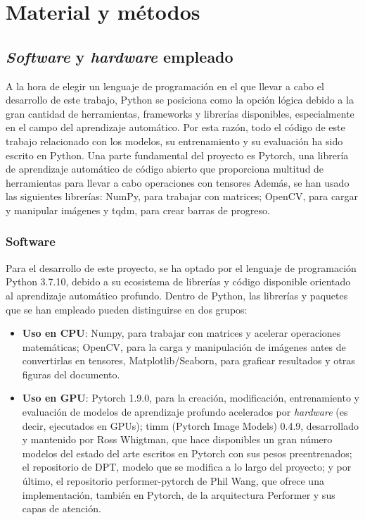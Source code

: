 \section{Material y métodos}

\subsection{\textit{Software} y \textit{hardware} empleado}

A la hora de elegir un lenguaje de programación en el que llevar a cabo el desarrollo de este trabajo, Python se posiciona como la opción lógica debido a la gran cantidad de herramientas, frameworks y librerías disponibles, especialmente en el campo del aprendizaje automático. Por esta razón, todo el código de este trabajo relacionado con los modelos, su entrenamiento y su evaluación ha sido escrito en Python.  Una parte fundamental del proyecto es Pytorch, una librería de aprendizaje automático de código abierto que proporciona multitud de herramientas para llevar a cabo operaciones con tensores 
Además, se han usado las siguientes librerías: NumPy, para trabajar con matrices; OpenCV, para cargar y manipular imágenes y tqdm, para crear barras de progreso.

\subsubsection{Software}


Para el desarrollo de este proyecto, se ha optado por el lenguaje de programación Python 3.7.10, debido a su ecosistema de librerías y código disponible orientado al aprendizaje automático profundo. Dentro de Python, las librerías y paquetes que se han empleado pueden distinguirse en dos grupos: 
\begin{itemize}
\item \textbf{Uso en CPU}: Numpy, para trabajar con matrices y acelerar operaciones matemáticas; OpenCV, para la carga y manipulación de imágenes antes de convertirlas en tensores, Matplotlib/Seaborn, para graficar resultados y otras figuras del documento.
\item \textbf{Uso en GPU}: Pytorch 1.9.0, para la creación, modificación, entrenamiento y evaluación de modelos de aprendizaje profundo acelerados por \textit{hardware} (es decir, ejecutados en GPUs); 	timm (Pytorch Image Models) 0.4.9, desarrollado y mantenido por Ross Whigtman, que hace disponibles un gran número modelos del estado del arte escritos en Pytorch con sus pesos preentrenados; el repositorio de DPT, modelo que se modifica a lo largo del proyecto; y por último, el repositorio performer-pytorch de Phil Wang, que ofrece una implementación, también en Pytorch, de la arquitectura Performer y sus capas de atención.
\end{itemize}

